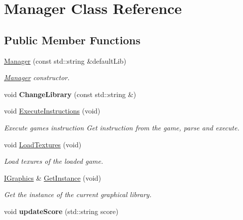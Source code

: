 \hypertarget{class_manager}{}\section{Manager Class Reference}
\label{class_manager}
\subsection*{Public Member Functions}
\begin{DoxyCompactItemize}
\item 
\hyperlink{class_manager_a72554004e4ab55571d9907455de28656}{Manager} (const std\+::string \&default\+Lib)
\begin{DoxyCompactList}\small\item\em \hyperlink{class_manager}{Manager} constructor. \end{DoxyCompactList}\item 
\mbox{\label{class_manager_a15d49cb59cbcd720e172ee0c6259e7d0}} 
void {\bfseries Change\+Library} (const std\+::string \&)
\item 
\mbox{\label{class_manager_aac988fe1a7a4cca17c0933d4ae5fffb4}} 
void \hyperlink{class_manager_aac988fe1a7a4cca17c0933d4ae5fffb4}{Execute\+Instructions} (void)
\begin{DoxyCompactList}\small\item\em Execute game\textquotesingle{}s instruction Get instruction from the game, parse and execute. \end{DoxyCompactList}\item 
\mbox{\label{class_manager_aeaea2e0414fef6b4bede43e7c9680840}} 
void \hyperlink{class_manager_aeaea2e0414fef6b4bede43e7c9680840}{Load\+Textures} (void)
\begin{DoxyCompactList}\small\item\em Load texures of the loaded game. \end{DoxyCompactList}\item 
\hyperlink{class_i_graphics}{I\+Graphics} \& \hyperlink{class_manager_a8cb265f0bd19351a88df4c167ece1377}{Get\+Instance} (void)
\begin{DoxyCompactList}\small\item\em Get the instance of the current graphical library. \end{DoxyCompactList}\item 
\mbox{\label{class_manager_a38a6ba7243dc9aa08922d77509141f8e}} 
void {\bfseries update\+Score} (std\+::string score)
\end{DoxyCompactItemize}


